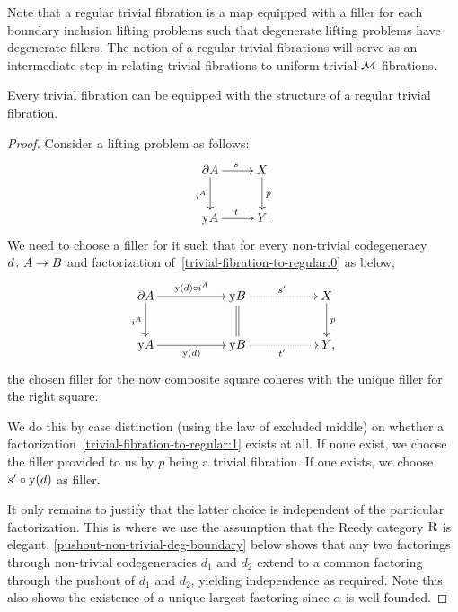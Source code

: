 \documentclass[reqno,10pt,a4paper,oneside,draft]{amsart}
\begin{document}
Note that a regular trivial fibration is a map equipped with a filler for each boundary inclusion lifting problems such that degenerate lifting problems have degenerate fillers.
The notion of a regular trivial fibrations will serve as an intermediate step in relating trivial fibrations to uniform trivial $\cal{M}$-fibrations.

\begin{proposition} \label{trivial-fibration-to-regular}
Every trivial fibration can be equipped with the structure of a regular trivial fibration.
\end{proposition}

\begin{proof}
Consider a lifting problem as follows:
\begin{equation} \label{trivial-fibration-to-regular:0}
\xymatrix{
  \partial A
  \ar[d]_{i^A}
  \ar[r]^{s}
&
  X
  \ar[d]^{p}
\\
  \yon A
  \ar[r]^{t}
&
  Y
\rlap{.}}
\end{equation}
We need to choose a filler for it such that for every non-trivial codegeneracy $d \co A \to B$ and factorization of~\eqref{trivial-fibration-to-regular:0} as below,
\begin{equation} \label{trivial-fibration-to-regular:1}
\xymatrix@C+3em{
  \partial A
  \ar[r]^{\yon(d) \cc i^A}
  \ar[d]_{i^A}
&
  \yon B
  \ar@{.>}[r]^{s'}
  \ar@{=}[d]
&
  X
  \ar[d]^{p}
\\
  \yon A
  \ar[r]_{\yon(d)}
&
  \yon B
  \ar@{.>}[r]_{t'}
&
  Y
\rlap{,}}
\end{equation}
the chosen filler for the now composite square coheres with the unique filler for the right square.

We do this by case distinction (using the law of excluded middle) on whether a factorization~\eqref{trivial-fibration-to-regular:1} exists at all.
If none exist, we choose the filler provided to us by $p$ being a trivial fibration.
If one exists, we choose $s' \cc \yon(d)$ as filler.

It only remains to justify that the latter choice is independent of the particular factorization.
This is where we use the assumption that the Reedy category $\R$ is elegant.
\cref{pushout-non-trivial-deg-boundary} below shows that any two factorings through non-trivial codegeneracies $d_1$ and $d_2$ extend to a common factoring through the pushout of $d_1$ and $d_2$, yielding independence as required.
Note this also shows the existence of a unique largest factoring since $\alpha$ is well-founded.
\end{proof}
\end{document}
